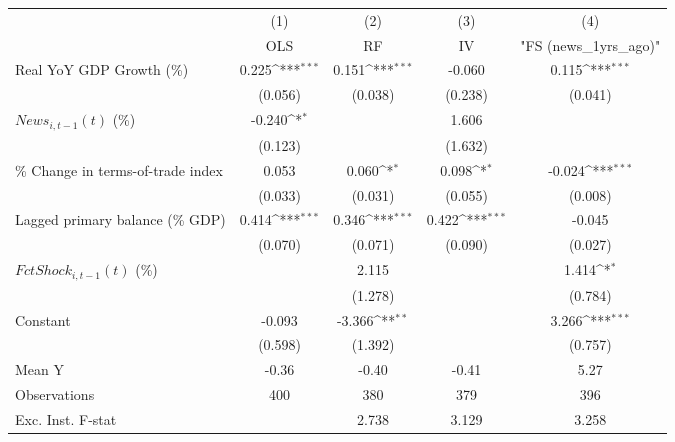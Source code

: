 {
\def\sym#1{\ifmmode^{#1}\else\(^{#1}\)\fi}
\begin{tabular}{l*{4}{c}}
\toprule
                    &\multicolumn{1}{c}{(1)}&\multicolumn{1}{c}{(2)}&\multicolumn{1}{c}{(3)}&\multicolumn{1}{c}{(4)}\\
                    &\multicolumn{1}{c}{OLS}&\multicolumn{1}{c}{RF}&\multicolumn{1}{c}{IV}&\multicolumn{1}{c}{ "FS (news_1yrs_ago)" }\\
\midrule
Real YoY GDP Growth (\%)&       0.225\sym{***}&       0.151\sym{***}&      -0.060         &       0.115\sym{***}\\
                    &     (0.056)         &     (0.038)         &     (0.238)         &     (0.041)         \\
\addlinespace
$ News_{i,t-1}(t)$ (\%)&      -0.240\sym{*}  &                     &       1.606         &                     \\
                    &     (0.123)         &                     &     (1.632)         &                     \\
\addlinespace
\% Change in terms-of-trade index&       0.053         &       0.060\sym{*}  &       0.098\sym{*}  &      -0.024\sym{***}\\
                    &     (0.033)         &     (0.031)         &     (0.055)         &     (0.008)         \\
\addlinespace
Lagged primary balance (\% GDP)&       0.414\sym{***}&       0.346\sym{***}&       0.422\sym{***}&      -0.045         \\
                    &     (0.070)         &     (0.071)         &     (0.090)         &     (0.027)         \\
\addlinespace
$ FctShock_{i,t-1}(t)$ (\%)&                     &       2.115         &                     &       1.414\sym{*}  \\
                    &                     &     (1.278)         &                     &     (0.784)         \\
\addlinespace
Constant            &      -0.093         &      -3.366\sym{**} &                     &       3.266\sym{***}\\
                    &     (0.598)         &     (1.392)         &                     &     (0.757)         \\
\midrule
Mean Y              &       -0.36         &       -0.40         &       -0.41         &        5.27         \\
Observations        &         400         &         380         &         379         &         396         \\
Exc. Inst. F-stat   &                     &       2.738         &       3.129         &       3.258         \\
\bottomrule
\end{tabular}
}
